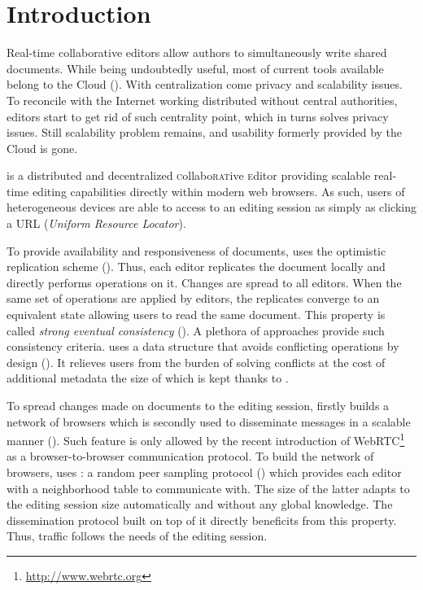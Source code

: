 
\section{Introduction}
\label{sec:introduction}

Real-time collaborative editors allow authors to simultaneously write shared
documents. While being undoubtedly useful, most of current tools available
belong to the Cloud (\REF). With centralization come privacy and scalability
issues. To reconcile with the Internet working distributed without central
authorities, editors start to get rid of such centrality point, which in turns
solves privacy issues. Still scalability problem remains, and usability formerly
provided by the Cloud is gone.

\CRATE is a distributed and decentralized \textsc{c}ollabo\textsc{rat}ive
\textsc{e}ditor providing scalable real-time editing capabilities directly
within modern web browsers. As such, users of heterogeneous devices are able to
access to an editing session as simply as clicking a URL (\emph{Uniform Resource
  Locator}).

To provide availability and responsiveness of documents, \CRATE uses the
optimistic replication scheme (\REF). Thus, each editor replicates the document
locally and directly performs operations on it. Changes are spread to all
editors. When the same set of operations are applied by editors, the replicates
converge to an equivalent state allowing users to read the same document.  This
property is called \emph{strong eventual consistency} (\REF). A plethora of
approaches provide such consistency criteria. \CRATE uses a data structure that
avoids conflicting operations by design (\REF). It relieves users from the
burden of solving conflicts at the cost of additional metadata the size of
which is kept  thanks to \LSEQ. 

To spread changes made on documents to the editing session, \CRATE firstly
builds a network of browsers which is secondly used to disseminate messages in a
scalable manner (\REF). Such feature is only allowed by the recent introduction
of WebRTC\footnote{\url{http://www.webrtc.org}} as a browser-to-browser
communication protocol. To build the network of browsers, \CRATE uses \SPRAY: a
random peer sampling protocol (\REF) which provides each editor with a
neighborhood table to communicate with. The size of the latter adapts to the
editing session size automatically and without any global knowledge. The
dissemination protocol built on top of it directly beneficits from this
property. Thus, traffic follows the needs of the editing session.

